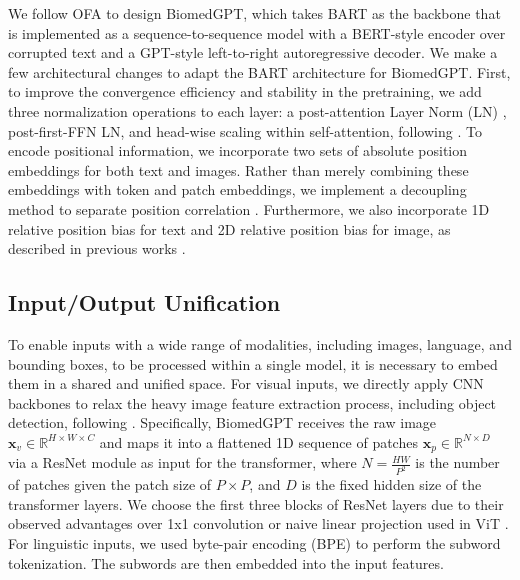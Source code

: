 \documentclass[10pt]{article} \usepackage[preprint]{tmlr}
\begin{document}
We follow OFA \citep{wang2022ofa} to design BiomedGPT, which takes BART \citep{lewis2019bart} as the backbone that is implemented as a sequence-to-sequence model with a BERT-style encoder over corrupted text and a GPT-style left-to-right autoregressive decoder. We make a few architectural changes to adapt the BART architecture for BiomedGPT. First, to improve the convergence efficiency and stability in the pretraining, we add three normalization operations to each layer: a post-attention Layer Norm (LN) \citep{ba2016layer}, post-first-FFN LN, and head-wise scaling within self-attention, following \citep{shleifer2021normformer}. To encode positional information, we incorporate two sets of absolute position embeddings for both text and images. Rather than merely combining these embeddings with token and patch embeddings, we implement a decoupling method to separate position correlation \citep{kitaev2018constituency, kerethinking}. Furthermore, we also incorporate 1D relative position bias for text and 2D relative position bias for image, as described in previous works \citep{raffel2020exploring, dai2021coatnet, wangsimvlm}.



\subsection{Input/Output Unification} \label{sec:unified_io}
To enable inputs with a wide range of modalities, including images, language, and bounding boxes, to be processed within a single model, it is necessary to embed them in a shared and unified space. For visual inputs, we directly apply CNN backbones to relax the heavy image feature extraction process, including object detection, following \citep{kim2021vilt}. Specifically, BiomedGPT receives the raw image $\mathbf{x}_v \in \mathbb{R}^{H \times W \times C}$ and maps it into a flattened 1D sequence of patches $\mathbf{x}_p \in \mathbb{R}^{N \times D}$ via a ResNet module as input for the transformer, where $N = \frac{HW}{P^2}$ is the number of patches given the patch size of $P \times P$, and $D$ is the fixed hidden size of the transformer layers. We choose the first three blocks of ResNet layers due to their observed advantages over 1x1 convolution or naive linear projection used in ViT \citep{wangsimvlm}. For linguistic inputs, we used byte-pair encoding (BPE) \citep{sennrich2016neural} to perform the subword tokenization. The subwords are then embedded into the input features.
\end{document}
